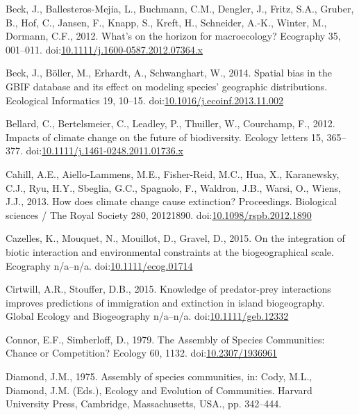 \hypertarget{ref-Beck2012}{}
Beck, J., Ballesteros-Mejia, L., Buchmann, C.M., Dengler, J., Fritz,
S.A., Gruber, B., Hof, C., Jansen, F., Knapp, S., Kreft, H., Schneider,
A.-K., Winter, M., Dormann, C.F., 2012. What's on the horizon for
macroecology? Ecography 35, 001--011.
doi:\href{https://doi.org/10.1111/j.1600-0587.2012.07364.x}{10.1111/j.1600-0587.2012.07364.x}

\hypertarget{ref-Beck2014a}{}
Beck, J., Böller, M., Erhardt, A., Schwanghart, W., 2014. Spatial bias
in the GBIF database and its effect on modeling species' geographic
distributions. Ecological Informatics 19, 10--15.
doi:\href{https://doi.org/10.1016/j.ecoinf.2013.11.002}{10.1016/j.ecoinf.2013.11.002}

\hypertarget{ref-Bellard2012}{}
Bellard, C., Bertelsmeier, C., Leadley, P., Thuiller, W., Courchamp, F.,
2012. Impacts of climate change on the future of biodiversity. Ecology
letters 15, 365--377.
doi:\href{https://doi.org/10.1111/j.1461-0248.2011.01736.x}{10.1111/j.1461-0248.2011.01736.x}

\hypertarget{ref-Cahill2013}{}
Cahill, A.E., Aiello-Lammens, M.E., Fisher-Reid, M.C., Hua, X.,
Karanewsky, C.J., Ryu, H.Y., Sbeglia, G.C., Spagnolo, F., Waldron, J.B.,
Warsi, O., Wiens, J.J., 2013. How does climate change cause extinction?
Proceedings. Biological sciences / The Royal Society 280, 20121890.
doi:\href{https://doi.org/10.1098/rspb.2012.1890}{10.1098/rspb.2012.1890}

\hypertarget{ref-Cazelles2015b}{}
Cazelles, K., Mouquet, N., Mouillot, D., Gravel, D., 2015. On the
integration of biotic interaction and environmental constraints at the
biogeographical scale. Ecography n/a--n/a.
doi:\href{https://doi.org/10.1111/ecog.01714}{10.1111/ecog.01714}

\hypertarget{ref-Cirtwill2015}{}
Cirtwill, A.R., Stouffer, D.B., 2015. Knowledge of predator-prey
interactions improves predictions of immigration and extinction in
island biogeography. Global Ecology and Biogeography n/a--n/a.
doi:\href{https://doi.org/10.1111/geb.12332}{10.1111/geb.12332}

\hypertarget{ref-Connor1979}{}
Connor, E.F., Simberloff, D., 1979. The Assembly of Species Communities:
Chance or Competition? Ecology 60, 1132.
doi:\href{https://doi.org/10.2307/1936961}{10.2307/1936961}

\hypertarget{ref-Diamond1975}{}
Diamond, J.M., 1975. Assembly of species communities, in: Cody, M.L.,
Diamond, J.M. (Eds.), Ecology and Evolution of Communities. Harvard
University Press, Cambridge, Massachusetts, USA., pp. 342--444.

